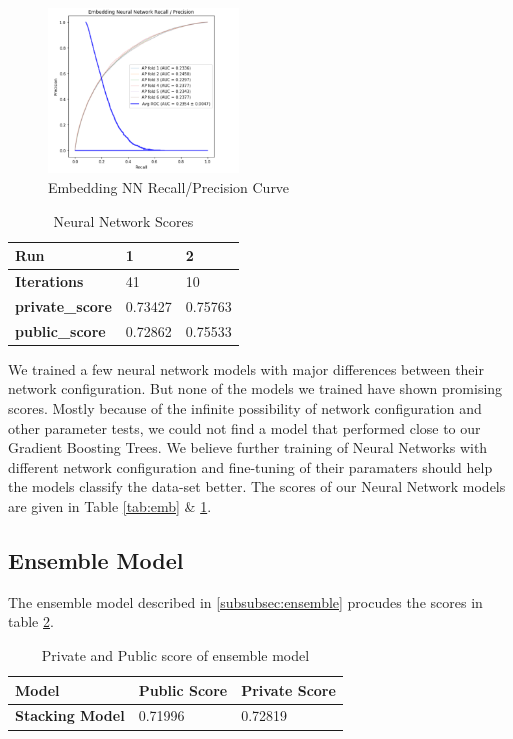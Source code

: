 \documentclass[sigconf, nonacm]{acmart}
\begin{document}
\begin{figure}[h]
	\centering
	\includegraphics[width=0.45\textwidth]{embedding_nn/Precision.PNG}
	\caption{Embedding NN Recall/Precision Curve}
	\label{fig:embedding_nn_recall}
\end{figure}

\begin{table}[h]
	\caption{Neural Network Scores}
	\label{tab:nn_pial}
	\begin{tabular}{@{}|l|l|l|@{}}
		\toprule
		\textbf{Run}            & \textbf{1} & \textbf{2} \\ \midrule
		\textbf{Iterations}     & 41         & 10         \\ \midrule
		\textbf{private\_score} & 0.73427    & 0.75763    \\ \midrule
		\textbf{public\_score}  & 0.72862    & 0.75533    \\ \bottomrule
	\end{tabular}
\end{table}  

We trained a few neural network models with major differences between their network configuration. But none of the models we trained have shown promising scores. Mostly because of the infinite possibility of network configuration and other parameter tests, we could not find a model that performed close to our Gradient Boosting Trees. We believe further training of Neural Networks with different network configuration and fine-tuning of their paramaters should help the models classify the data-set better. The scores of our Neural Network models are given in Table \ref{tab:emb} \& \ref{tab:nn_pial}.

\subsection{Ensemble Model}

The ensemble model described in \ref{subsubsec:ensemble} procudes the scores in table \ref{tab:ensemble}.
\begin{table}[h]
	\caption{Private and Public score of ensemble model}
	\label{tab:ensemble}
	\begin{tabular}{@{}|l|l|l|@{}}
		\toprule
		\textbf{Model}          & \textbf{Public Score} & \textbf{Private Score} \\ \midrule
		\textbf{Stacking Model} & 0.71996               & 0.72819                \\ \midrule
	\end{tabular}
\end{table}
\end{document}
